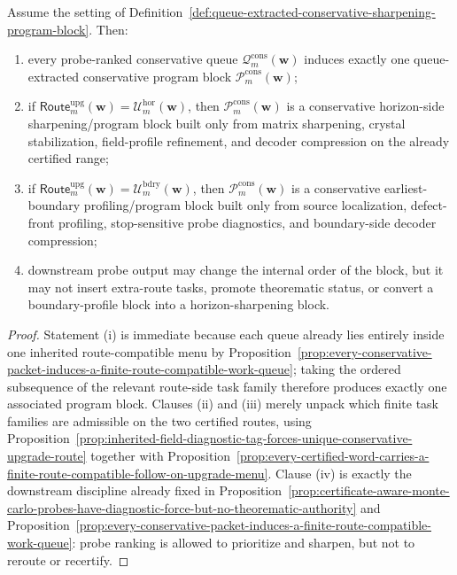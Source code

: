 \begin{proposition}
\label{prop:every-probe-ranked-conservative-queue-induces-one-route-faithful-working-program-block}
Assume the setting of Definition~\ref{def:queue-extracted-conservative-sharpening-program-block}. Then:
\begin{enumerate}[label=(\roman*)]
  \item every probe-ranked conservative queue \(\mathcal Q^{\mathrm{cons}}_{m}(\mathbf w)\) induces exactly one queue-extracted conservative program block \(\mathcal P^{\mathrm{cons}}_{m}(\mathbf w)\);
  \item if \(\mathsf{Route}^{\mathrm{upg}}_{m}(\mathbf w)=\mathcal U^{\mathrm{hor}}_{m}(\mathbf w)\), then \(\mathcal P^{\mathrm{cons}}_{m}(\mathbf w)\) is a conservative horizon-side sharpening/program block built only from matrix sharpening, crystal stabilization, field-profile refinement, and decoder compression on the already certified range;
  \item if \(\mathsf{Route}^{\mathrm{upg}}_{m}(\mathbf w)=\mathcal U^{\mathrm{bdry}}_{m}(\mathbf w)\), then \(\mathcal P^{\mathrm{cons}}_{m}(\mathbf w)\) is a conservative earliest-boundary profiling/program block built only from source localization, defect-front profiling, stop-sensitive probe diagnostics, and boundary-side decoder compression;
  \item downstream probe output may change the internal order of the block, but it may not insert extra-route tasks, promote theorematic status, or convert a boundary-profile block into a horizon-sharpening block.
\end{enumerate}
\end{proposition}

\begin{proof}
Statement (i) is immediate because each queue already lies entirely inside one inherited route-compatible menu by Proposition~\ref{prop:every-conservative-packet-induces-a-finite-route-compatible-work-queue}; taking the ordered subsequence of the relevant route-side task family therefore produces exactly one associated program block. Clauses (ii) and (iii) merely unpack which finite task families are admissible on the two certified routes, using Proposition~\ref{prop:inherited-field-diagnostic-tag-forces-unique-conservative-upgrade-route} together with Proposition~\ref{prop:every-certified-word-carries-a-finite-route-compatible-follow-on-upgrade-menu}. Clause (iv) is exactly the downstream discipline already fixed in Proposition~\ref{prop:certificate-aware-monte-carlo-probes-have-diagnostic-force-but-no-theorematic-authority} and Proposition~\ref{prop:every-conservative-packet-induces-a-finite-route-compatible-work-queue}: probe ranking is allowed to prioritize and sharpen, but not to reroute or recertify.
\end{proof}

